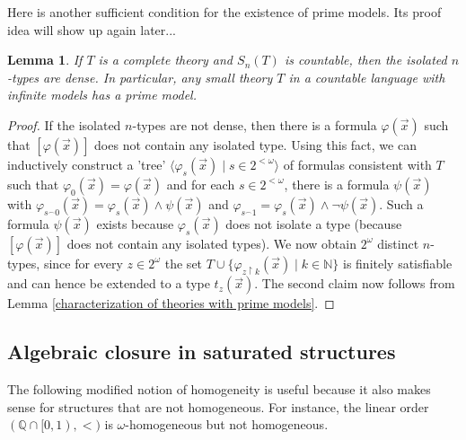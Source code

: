 \documentclass[10pt]{amsart}
\newcommand{\QQ}{\mathbb{Q}}
\newcommand{\NNN}{\mathbb{N}}
\newtheorem{lemma}[theorem]{Lemma}
\theoremstyle{definition}
\theoremstyle{remark}
\begin{document}
Here is another sufficient condition for the existence of prime models. Its proof idea will show up again later... 

\begin{lemma} 
If $T$ is a complete theory and $S_n(T)$ is countable, then the isolated $n$-types are dense. In particular, any small theory $T$ in a countable language with infinite models has a prime model. 
\end{lemma} 
\begin{proof} 
If the isolated $n$-types are not dense, then there is a formula $\varphi(\vec{x})$ such that $[\varphi(\vec{x})]$ does not contain any isolated type. Using this fact, we can inductively construct a 'tree' $\langle \varphi_s(\vec{x})\mid s \in 2^{<\omega}\rangle$ of formulas consistent with $T$ such that $\varphi_0(\vec{x})=\varphi(\vec{x})$ and for each $s\in 2^{<\omega}$, there is a formula $\psi(\vec{x})$ with $\varphi_{s^\smallfrown 0}(\vec{x})=\varphi_s(\vec{x})\wedge\psi(\vec{x})$ and $\varphi_{s^\smallfrown 1}=\varphi_s(\vec{x})\wedge\neg \psi(\vec{x})$. Such a formula $\psi(\vec{x})$ exists because $\varphi_s(\vec{x})$ does not isolate a type (because $[\varphi(\vec{x})]$ does not contain any isolated types). We now obtain $2^\omega$ distinct $n$-types, since for every $z\in 2^\omega$ the set $T\cup\{\varphi_{z{\upharpoonright}k}(\vec{x})\mid k\in\NNN\}$ is finitely satisfiable and can hence be extended to a type $t_z(\vec{x})$. The second claim now follows from Lemma \ref{characterization of theories with prime models}. 
\end{proof} 





\subsection{Algebraic closure in saturated structures} 


The following modified notion of homogeneity is useful because it also makes sense for structures that are not homogeneous. For instance, the linear order $(\QQ\cap [0,1),<)$ is $\omega$-homogeneous but not homogeneous. 
\end{document}
